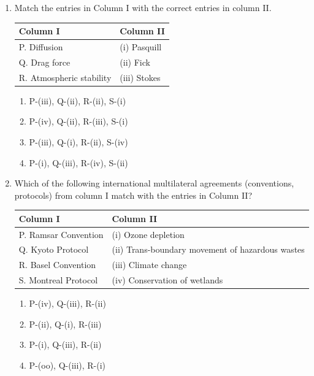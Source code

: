\documentclass[journal]{IEEEtran}
\begin{document}
\begin{enumerate}[start=1]
\item Match the entries in Column I with the correct entries in column II.
\hfill{}
\begin{table}[H]
\centering
\begin{tabular}{|l|l|}
\hline
\textbf{Column I} & \textbf{Column II} \\ \hline
P. Diffusion & (i) Pasquill \\ \hline
Q. Drag force & (ii) Fick \\ \hline
R. Atmospheric stability & (iii) Stokes \\ \hline
\end{tabular}
\end{table}
\begin{enumerate}
    \item P-(iii), Q-(ii), R-(ii), S-(i)
    \item P-(iv), Q-(ii), R-(iii), S-(i)
    \item P-(iii), Q-(i), R-(ii), S-(iv)
    \item P-(i), Q-(iii), R-(iv), S-(ii)
\end{enumerate}

\item Which of the following international multilateral agreements (conventions, protocols) from column I match with the entries in Column II?
\hfill{}
\begin{table}[H]
\centering
\renewcommand{\arraystretch}{1.3} %
\begin{tabular}{|l|l|}
\hline
Column I & Column II \\ \hline
P. Ramsar Convention & (i) Ozone depletion \\ \hline
Q. Kyoto Protocol & (ii) Trans-boundary movement of hazardous wastes \\ \hline
R. Basel Convention & (iii) Climate change \\ \hline
S. Montreal Protocol & (iv) Conservation of wetlands \\ \hline
\end{tabular}
\end{table}
\begin{enumerate}
    \item P-(iv), Q-(iii), R-(ii)
    \item P-(ii), Q-(i), R-(iii)
    \item P-(i), Q-(iii), R-(ii)
    \item P-(oo), Q-(iii), R-(i)
\end{enumerate}



\end{enumerate}
\end{document}
